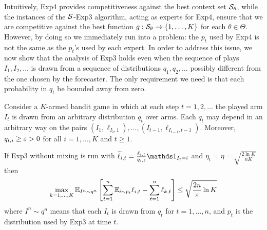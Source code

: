 Intuitively, Exp4 provides competitiveness against the best context set $\mathcal{S}_{\theta}$, while the instances of the $\mathcal{S}$-Exp3 algorithm, acting as experts for Exp4, ensure that we are competitive against the best function $g : \mathcal{S}_{\theta} \to \{1,\dots,K\}$ for each $\theta\in\Theta$. However, by doing so we immediately run into a problem: the $p_t$ used by Exp4 is not the same as the $p_t$'s used by each expert. In order to address this issue, we now show that the analysis of Exp3 holds even when the sequence of plays $I_1,I_2,\dots$ is drawn from a sequence of distributions $q_1,q_2,\dots$ possibly different from the one chosen by the forecaster. The only requirement we need is that each probability in $q_t$ be bounded away from zero.
%
\begin{theorem}
\label{th:exp3-rebel}
Consider a $K$-armed bandit game in which at each step $t=1,2,\dots$ the played arm $I_t$ is drawn from an arbitrary distribution $q_t$ over arms. Each $q_t$ may depend in an arbitrary way on the pairs $(I_1,\ell_{I_1,1}),\dots,(I_{t-1},\ell_{I_{t-1},t-1})$. Moreover, $q_{t,i} \ge \varepsilon > 0$ for all $i=1,\dots,K$ and $t \ge 1$.

If Exp3 without mixing is run with $\tilde{\ell}_{i,t} = \frac{\ell_{i,t}}{q_{i,t}} \ds1_{I_t = i}$ and $\eta_t = \eta = \sqrt{\frac{2\ln K}{n K}}$ then
\begin{equation}
    \max_{k=1,\dots,K} \mathbb{E}_{I^n \sim q^n} \left[ \sum_{t=1}^n \mathbb{E}_{i \sim p_t} \ell_{i,t} - \sum_{t=1}^n \ell_{k,t} \right] \le
    \sqrt{\frac{2 n}{\varepsilon}\ln K}
\end{equation}
where $I^n \sim q^n$ means that each $I_t$ is drawn from $q_t$ for $t=1,\dots,n$, and $p_t$ is the distribution used by Exp3 at time $t$.
\end{theorem}
%
